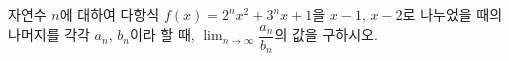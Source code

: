 자연수 $n$에 대하여 다항식 $f(x)=2^nx^2+3^nx+1$을 $x-1$, $x-2$로 나누었을 때의 나머지를 각각 $a_n$, $b_n$이라 할 때, $\displaystyle\lim_{n\to\infty}\dfrac{a_n}{b_n}$의 값을 구하시오.
